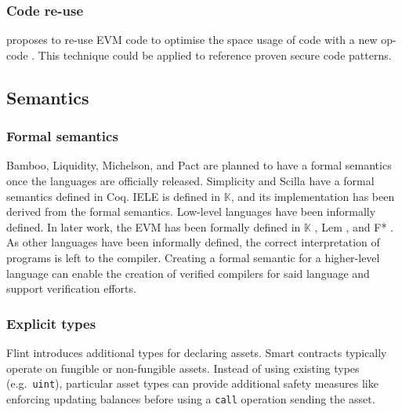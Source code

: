 

\subsubsection{Code re-use}
\citeauthor{Pontiveros2018} proposes to re-use EVM code to optimise the space usage of code with a new op-code \cite{Pontiveros2018}. This technique could be applied to reference proven secure code patterns.

\subsection{Semantics}

\subsubsection{Formal semantics}
Bamboo, Liquidity, Michelson, and Pact are planned to have a formal semantics once the languages are officially released.  Simplicity and Scilla have a formal semantics defined in Coq. IELE is defined in $\mathbb{K}$, and its implementation has been derived from the formal semantics.
Low-level languages have been informally defined. In later work, the EVM has been formally defined in $\mathbb{K}$ \cite{Hildenbrandt2017}, Lem \cite{Hirai2017}, and F* \cite{Grishchenko2018}.
As other languages have been informally defined, the correct interpretation of programs is left to the compiler. Creating a formal semantic for a higher-level language can enable the creation of verified compilers for said language and support verification efforts.

\subsubsection{Explicit types}
Flint introduces additional types for declaring assets. Smart contracts typically operate on fungible or non-fungible assets. Instead of using existing types (e.g.\ \texttt{uint}), particular asset types can provide additional safety measures like enforcing updating balances before using a \texttt{call} operation sending the asset.


